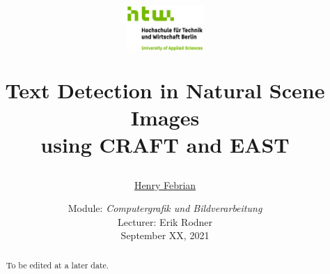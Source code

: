 \documentclass[a4paper]{article}
\begin{document}
	\title{
	\begin{figure}[!ht]
			\includegraphics[width=0.26\textwidth]{img/htwlogo.jpg}
	\end{figure}
	\vspace{1cm}
	\Huge Text Detection in Natural Scene Images \\
	using CRAFT and EAST
	}
	
	\vspace{1cm}
	
	
	\author{\Large \href{mailto:s0566146@htw-berlin.de}{Henry Febrian}
	\vspace{1cm}}
	
	\date{
	\large Module: \textit{Computergrafik und Bildverarbeitung} \\
	\vspace{0.8cm}
	\large Lecturer: Erik Rodner \\
	\vspace{1cm}
	\large September XX, 2021
	}

	\maketitle
	\setlength{\parindent}{0pt}

\vspace{2cm}
\begin{abstract}
To be edited at a later date. 

\end{abstract}
	\newpage
	\tableofcontents
	\newpage
	
\end{document}
